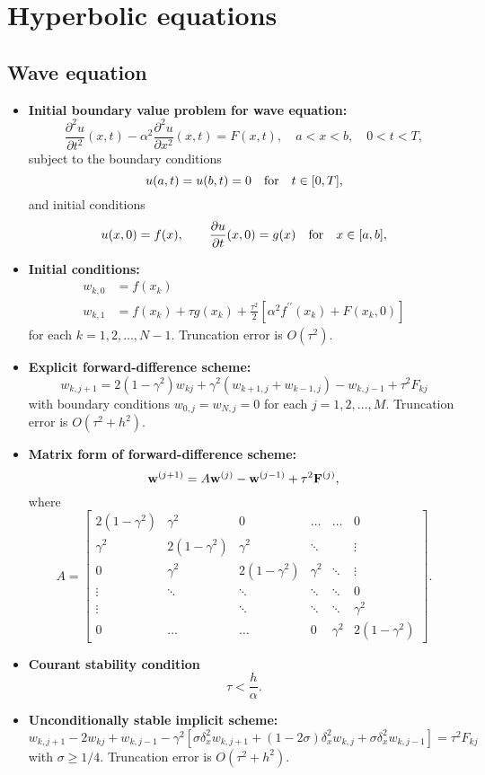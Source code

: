 \documentclass[12pt]{article}
\newcommand\pr{\partial}
\begin{document}
\section*{Hyperbolic equations}
\subsection*{Wave equation}

\begin{itemize}

\item \textbf{Initial boundary value problem for wave equation:}
\[
\frac{\pr^{2} u}{\pr t^{2}}(x,t) - \alpha^{2}\frac{\pr^{2} u}{\pr
x^{2}}(x,t)=F(x,t), \quad a<x< b, \quad 0<t<T,   \label{1}
\]
subject to the boundary conditions
\[
u(a, t) = u(b, t)=0 \quad \hbox{for} \quad t\in[0,T],   \label{2}
\]
and initial conditions
\[
u(x, 0) = f(x), \qquad
\frac{\pr u}{\pr t}(x,0)=g(x)  \quad \hbox{for} \quad x\in[a,b],
\]


\item \textbf{Initial conditions:}
\[\begin{split}
w_{k,0}&=f(x_{k}) \\
w_{k,1}&=f(x_{k})+\tau g(x_{k})+
\frac{\tau^{2}}{2}\left[\alpha^{2}f^{\prime\prime}(x_{k})+F(x_{k},0)\right]
\end{split}\]
for each $k=1, 2, \dots, N-1$. Truncation error is $O(\tau^2)$.

\item \textbf{Explicit forward-difference scheme:}
\[
w_{k,j+1}=2\left(1-\gamma^{2}\right)w_{kj}+
\gamma^{2}\left(w_{k+1, j}+w_{k-1,j}\right)-w_{k,j-1}+\tau^2
F_{kj}
\]
with boundary conditions
$w_{0,j}=w_{N,j}=0$ for each $j=1, 2, \dots,M$.
Truncation error is $O(\tau^2+h^2)$.

\item \textbf{Matrix form of forward-difference scheme:}
\[
{\bf w}^{(j+1)}=A{\bf w}^{(j)}-{\bf w}^{(j-1)}+\tau^2{\bf F}^{(j)},
\]
where
\[
A=\left[
\begin{array}{cccccc}
2(1-\gamma^{2}) &\gamma^{2} &0      &\dots  &\dots &0 \\
\gamma^{2} &2(1-\gamma^{2}) &\gamma^{2} &\ddots  &     &\vdots \\
0      &\gamma^{2} &2(1-\gamma^{2}) &\gamma^{2} &\ddots &\vdots \\
\vdots &\ddots &\ddots &\ddots &\ddots &0 \\
\vdots &       &\ddots &\ddots &\ddots &\gamma^{2} \\
0      &\dots  &\dots  &0      &\gamma^{2} &2(1-\gamma^{2})
\end{array}\right].
\]

\item \textbf{Courant stability condition}
\[
\tau < \frac{h}{\alpha}.
\]


\item \textbf{Unconditionally stable implicit scheme:}
\[
w_{k,j+1}-2w_{kj}+w_{k,j-1}-\gamma^{2} \left[\sigma \delta_{x}^2
w_{k,j+1}+(1-2\sigma)\delta_{x}^2 w_{k,j} +\sigma \delta_{x}^2
w_{k,j-1}\right]=\tau^2 F_{kj}
\]
with $\sigma\geq 1/4$. Truncation error is $O(\tau^2+h^2)$.

\end{itemize}
\end{document}
